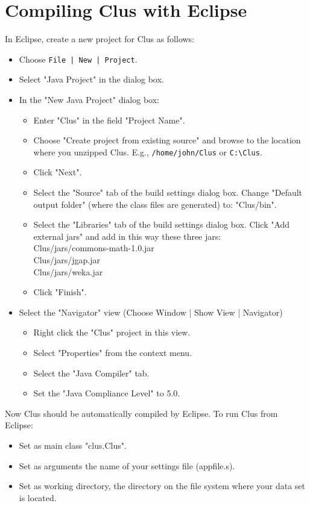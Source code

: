 \section{Compiling Clus with Eclipse}

In Eclipse, create a new project for Clus as follows:

\begin{itemize}
\item Choose \verb^File | New | Project^.
\item Select "Java Project" in the dialog box.
\item In the "New Java Project" dialog box:
 \begin{itemize}
 \item Enter "Clus" in the field "Project Name".
 \item Choose "Create project from existing source" and browse to the location where 
      you unzipped Clus. E.g., \verb^/home/john/Clus^ or \verb^C:\Clus^.
 \item Click "Next".
 \item Select the "Source" tab of the build settings dialog box.
     Change "Default output folder" (where the class files are generated) to: "Clus/bin".
 \item Select the "Libraries" tab of the build settings dialog box.
     Click "Add external jars" and add in this way these three jars:\\
        Clus/jars/commons-math-1.0.jar\\
        Clus/jars/jgap.jar\\
        Clus/jars/weka.jar
 \item Click "Finish".
 \end{itemize}
\item Select the "Navigator" view (Choose Window | Show View | Navigator)
 \begin{itemize}
   \item  Right click the "Clus" project in this view.
   \item  Select "Properties" from the context menu.
   \item  Select the "Java Compiler" tab.
   \item  Set the "Java Compliance Level" to 5.0.
 \end{itemize}
\end{itemize}
Now Clus should be automatically compiled by Eclipse.
To run Clus from Eclipse:
 \begin{itemize}
   \item Set as main class "clus.Clus".
   \item Set as arguments the name of your settings file (appfile.s).
   \item Set as working directory, the directory on the file system where your data set is located.
\end{itemize}

